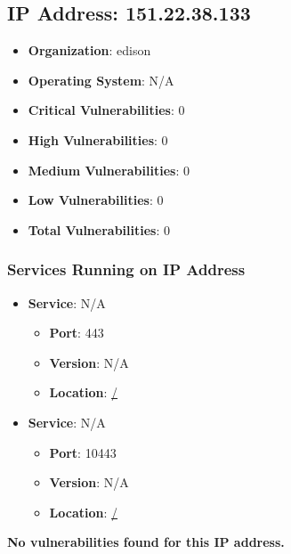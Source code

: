 \documentclass{article}
\begin{document}
\clearpage



\subsection{IP Address: 151.22.38.133}

\begin{itemize}
    \item \textbf{Organization}: edison
    \item \textbf{Operating System}:  N/A 
    \item \textbf{Critical Vulnerabilities}: 0
    \item \textbf{High Vulnerabilities}: 0
    \item \textbf{Medium Vulnerabilities}: 0
    \item \textbf{Low Vulnerabilities}: 0
    \item \textbf{Total Vulnerabilities}: 0
\end{itemize}

\subsubsection*{Services Running on IP Address}

\begin{itemize}
    
        \item \textbf{Service}: N/A
        \begin{itemize}
            \item \textbf{Port}: 443
            \item \textbf{Version}:  N/A 
            \item \textbf{Location}: \href{ / }{ / }
        \end{itemize}
    
        \item \textbf{Service}: N/A
        \begin{itemize}
            \item \textbf{Port}: 10443
            \item \textbf{Version}:  N/A 
            \item \textbf{Location}: \href{ / }{ / }
        \end{itemize}
    
\end{itemize}


\textbf{No vulnerabilities found for this IP address.}
\end{document}
